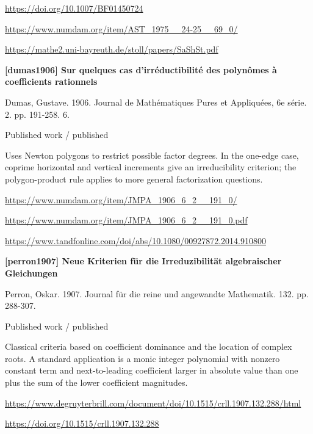 \documentclass[11pt,a4paper,oneside,openany]{book}
\begin{document}
{\footnotesize\url{https://doi.org/10.1007/BF01450724}}\par
{\footnotesize\url{https://www.numdam.org/item/AST_1975__24-25__69_0/}}\par
{\footnotesize\url{https://mathe2.uni-bayreuth.de/stoll/papers/SaShSt.pdf}}\par
\vspace{9pt}
\hypertarget{ref:dumas1906}{}
{\sffamily\bfseries\color{atlasgreen}[dumas1906] Sur quelques cas d'irréductibilité des polynômes à coefficients rationnels}\par
\color{black} Dumas, Gustave. 1906. Journal de Mathématiques Pures et Appliquées, 6e série. 2. pp. 191-258. 6.\par
{\small\sffamily\color{atlasgold}Published work / published}\par
\color{black} Uses Newton polygons to restrict possible factor degrees. In the one-edge case, coprime horizontal and vertical increments give an irreducibility criterion; the polygon-product rule applies to more general factorization questions.\par
{\footnotesize\url{https://www.numdam.org/item/JMPA_1906_6_2__191_0/}}\par
{\footnotesize\url{https://www.numdam.org/item/JMPA_1906_6_2__191_0.pdf}}\par
{\footnotesize\url{https://www.tandfonline.com/doi/abs/10.1080/00927872.2014.910800}}\par
\vspace{9pt}
\hypertarget{ref:perron1907}{}
{\sffamily\bfseries\color{atlasgreen}[perron1907] Neue Kriterien für die Irreduzibilität algebraischer Gleichungen}\par
\color{black} Perron, Oskar. 1907. Journal für die reine und angewandte Mathematik. 132. pp. 288-307.\par
{\small\sffamily\color{atlasgold}Published work / published}\par
\color{black} Classical criteria based on coefficient dominance and the location of complex roots. A standard application is a monic integer polynomial with nonzero constant term and next-to-leading coefficient larger in absolute value than one plus the sum of the lower coefficient magnitudes.\par
{\footnotesize\url{https://www.degruyterbrill.com/document/doi/10.1515/crll.1907.132.288/html}}\par
{\footnotesize\url{https://doi.org/10.1515/crll.1907.132.288}}\par
\end{document}
